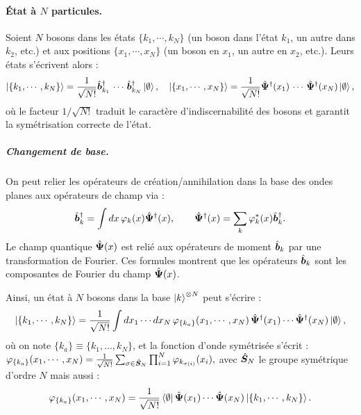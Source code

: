 \paragraph{État à $N$ particules.} Soient $N$ bosons dans les états $\{ k_1 , \cdots , k_N \}$ (un boson dans l’état $k_1$, un autre dans $k_2$, etc.) et aux positions $\{ x_1 , \cdots , x_N \}$ (un boson en $x_1$, un autre en $x_2$, etc.). Leurs états s’écrivent alors :
\begin{eqnarray}
	\ket{ \{ k_1 , \cdots , k_N \}} = \frac{1}{\sqrt{N!}} \hat{\bm{b}}_{k_1}^\dag\, \cdots \, \hat{\bm{b}}_{k_N}^\dag \ket{\emptyset}, \quad \ket{\{x_1 , \cdots , x_N\}} = \frac{1}{\sqrt{N!}} \hat{\bm{\Psi}}^\dag(x_1)\, \cdots \, \hat{\bm{\Psi}}^\dag(x_N) \ket{\emptyset}	, \label{eq.chap.1.ket.N}
\end{eqnarray}
où le facteur \( 1/\sqrt{N!} \) traduit le caractère d’indiscernabilité des bosons et garantit la symétrisation correcte de l’état.

\begin{mdframed}[
	linewidth=0.5pt, 
	backgroundcolor=gray!5, 
	roundcorner=50pt,	
	innerleftmargin=5pt,
    innerrightmargin=5pt,
    innertopmargin=-10pt,
    innerbottommargin=2pt,
    leftmargin=2pt,
    rightmargin=2pt
	]
\subparagraph{Changement de base.}
On peut relier les opérateurs de création/annihilation dans la base des ondes planes aux opérateurs de champ via :
\begin{eqnarray}\label{chap.1:eq.rapel.etat.second.1}
	\hat{\bm{b}}_k^\dagger = \int dx \, \varphi_k(x) \hat{\bm{\Psi}}^\dagger(x), \qquad 
	\hat{\bm{\Psi}}^\dagger(x) = \sum_k \varphi_k^\ast(x)\hat{\bm{b}}_k^\dagger.\label{eq.chap.1.TF.1}
\end{eqnarray}
Le champ quantique $\hat{\bm{\Psi}}(x)$ est relié aux opérateurs de moment $\hat{\bm{b}}_k$ par une transformation de Fourier. Ces formules montrent que les opérateurs $\hat{\bm{b}}_{k}$ sont les composantes de Fourier du champ $\hat{\bm{\Psi}}(x)$.
\end{mdframed}
Ainsi, un état à \(N\) bosons dans la base \( \ket{k}^{\otimes N} \) peut s’écrire :
\begin{eqnarray}
	\ket{\{k_1 , \cdots , k_N\}} = \frac{1}{\sqrt{N!}} \int dx_1 \cdots dx_N \, \varphi_{\{k_a\}} ( x_1 , \cdots , x_N ) \, \hat{\bm{\Psi}}^\dag(x_1) \cdots \hat{\bm{\Psi}}^\dag(x_N) \ket{\emptyset},
\end{eqnarray}
où on note \( \{k_a\} \equiv \{k_1, \dots, k_N\} \), et la fonction d’onde symétrisée s’écrit :
\(
	\varphi_{\{k_a\}} ( x_1 , \cdots , x_N ) = \frac{1}{\sqrt{N!}} \sum_{\sigma \in \hat{\bm{S}}_N } \prod_{i=1}^N \varphi_{k_{\sigma(i)}}(x_i),
\) 
avec $\hat{\bm{S}}_N $  le groupe symétrique d'ordre $N$ mais aussi :
\begin{eqnarray}
	\varphi_{\{k_a\}} ( x_1 , \cdots , x_N ) = \frac{1}{\sqrt{N!}} \bra{\emptyset} \hat{\bm{\Psi}}(x_1) \cdots \hat{\bm{\Psi}}(x_N) \ket{\{k_1, \cdots , k_N\}}.
\end{eqnarray}



